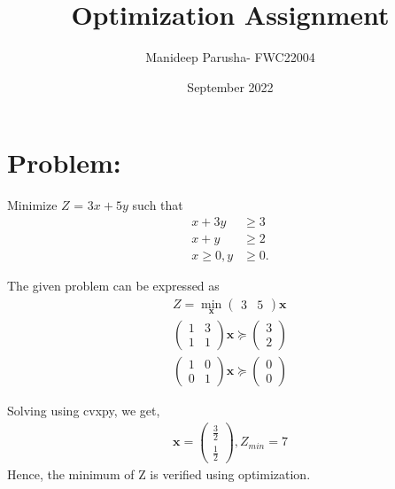 \documentclass[a4paper,12pt,twocolumn]{article}
\title{Optimization Assignment}
\author{Manideep Parusha- FWC22004}
\date{September 2022}
\let\vec\mathbf
\newcommand{\myvec}[1]{\ensuremath{\begin{pmatrix}#1\end{pmatrix}}}
\begin{document}
\maketitle
\section{Problem:}
\fi
Minimize $Z$ = $3x+5y$ such that 
\begin{align}
x+3y&\ge3
\\
x+y&\ge2
\\
x\ge0, y&\ge0.
\end{align}
\solution
\iffalse
\maketitle
\section{Solution:}
We need to first graph the feasible region of the system of inequalities. The feasible region is shown in the above figure in color red. The region is bounded. We need to find the coordinates of corner points and figure the minimum value of $Z$. The given set of equations are:
\begin{align}
	x+3y\ge3\\
	x+y\ge2\\
	x\ge0\\
	y\ge0
\end{align}
\fi
The given problem can be expressed as
\begin{align}
	Z = \min_{\vec{x}}\myvec{3 & 5}\vec{x}
	\\
	\myvec{1 & 3\\1&1}\vec{x}\succeq\myvec{3\\2}\\
	\myvec{1&0\\0&1}\vec{x}\succeq\myvec{0\\0}
\end{align}
\iffalse
We need to find the intersection of given system of inequalities, to figure out the coordinates of feasible region.
The coordinates of the quadrilateral are $\myvec{0\\2}$, $\myvec{\frac{3}{2}\\\frac{1}{2}}$, $\myvec{3\\0}$.
\fi
Solving using cvxpy, we get,
\begin{align}
	\vec{x} = \myvec{\frac{3}{2}\\\frac{1}{2}},
	Z_{min} = 7
\end{align}
\iffalse
Hence, the minimum of Z is verified using optimization.
 
\end{document}
